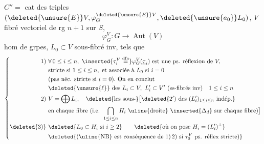 $\boxed{C''}={}$ cat des triples $(\deleted{\unsure{E}}V,\varphi_G^{\deleted{\unsure{E}}V},\deleted{\unsure{a_0}}L_0)$, $V$ fibré vectoriel de rg $n+1$ sur $S$,
\[
\varphi_G^V:G\longrightarrow\operatorname{Aut}(V)
\]
hom de grpes, $L_0\subset V$ sous-fibré inv, tels que
\[
\left\{\begin{aligned}
1)\ &\forall\,0\leq i\leq n,\ \inserted{\tau_i^V\overset{\mathrm{dfn}}{=}}\varphi_G^V(\underline\tau_i)\text{ est une ps. réflexion de }V,\\
&\text{stricte si }1\leq i\leq n,\text{ et associée à }L_0\text{ si }i=0\\
&\text{(pas néc. stricte si }i=0).\ \text{On en conclut}\\
&\deleted{\unsure{\ell}}\ \text{des }L_i\subset V,\ L'_i\subset V'\ \text{(ss-fibrés inv)}\quad 1\leq i\leq n\\
2)\ &V=\bigoplus L_i,\quad\deleted{\text{les sous-}}\bigl[\deleted{2')\ \text{des }(L'_i)_{1\leq i\leq n}\text{ indép.}}\\
&\text{en chaque fibre (i.e. }\bigcap_{1\leq i\leq n}H_i\ \text{\uline{droite}}\ \inserted{\Delta_d}\ \text{sur chaque fibre)}\bigr]\\
\deleted{3)}\ &\deleted{L_0\subset H_i\ \text{si }i\geq2}\qquad\deleted{\text{où on pose }H_i=(L'_i)^\perp}\\
&\deleted{\text{(\uline{NB} est conséquence de }1)\,2)\text{ si }\tau_0^V\text{ ps. réflex stricte)}}
\end{aligned}\right.
\]


